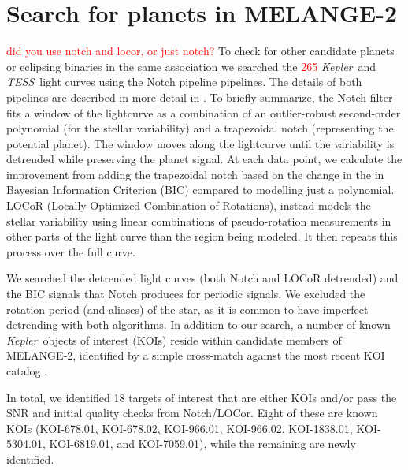 \documentclass[twocolumn]{aastex631}
\newcommand{\kepler}{{\it Kepler}}
\newcommand{\tess}{\textit{TESS}}
\newcommand{\association}{MELANGE-2}
\begin{document}



\section{Search for planets in MELANGE-2}\label{sec:search}

\textcolor{red}{did you use notch and locor, or just notch?}
To check for other candidate planets or eclipsing binaries in the same association we searched the \textcolor{red}{265} \kepler\ and \tess\ light curves using the Notch pipeline pipelines. The details of both pipelines are described in more detail in \citet{Rizzuto2017}. To briefly summarize, the Notch filter fits a window of the lightcurve as a combination of an outlier-robust second-order polynomial (for the stellar variability) and a trapezoidal notch (representing the potential planet). The window moves along the lightcurve until the variability is detrended while preserving the planet signal. At each data point, we calculate the improvement from adding the trapezoidal notch based on the change in the in Bayesian Information Criterion (BIC) compared to modelling just a polynomial. LOCoR (Locally Optimized Combination of Rotations), instead models the stellar variability using linear combinations of pseudo-rotation measurements in other parts of the light curve than the region being modeled. It then repeats this process over the full curve. 

We searched the detrended light curves (both Notch and LOCoR detrended) and the BIC signals that Notch produces for periodic signals. We excluded the rotation period (and aliases) of the star, as it is common to have imperfect detrending with both algorithms. In addition to our search, a number of known \kepler\ objects of interest (KOIs) reside within candidate members of \association, identified by a simple cross-match against the most recent KOI catalog \citep{2016AJ....152..158T}. 

In total, we identified 18 targets of interest that are either KOIs and/or pass the SNR and initial quality checks from Notch/LOCor. Eight of these are known KOIs (KOI-678.01, KOI-678.02, KOI-966.01, KOI-966.02, KOI-1838.01, KOI-5304.01, KOI-6819.01, and KOI-7059.01), while the remaining are newly identified. 
\end{document}
